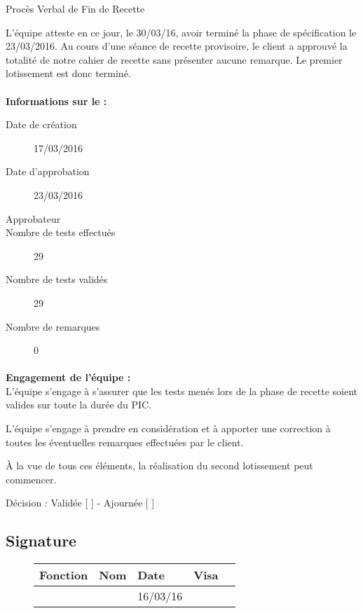 \documentclass[asi, sansVersion]{picInsa}
\begin{document}
 
 \begin{center}
  \LARGE{}
    Procès Verbal de Fin de Recette\\
 \end{center}
 
 \normalsize{}
 
L'équipe \nomEquipe{} atteste en ce jour, le 30/03/16, avoir terminé la phase de spécification le 23/03/2016.
Au cours d'une séance de recette provisoire, le client a approuvé la totalité de notre cahier de recette sans présenter aucune remarque. Le premier lotissement est donc terminé.


\paragraph{}
\textbf{Informations sur le \CDR :}

\begin{description}
  \item[Date de création]17/03/2016
  \item[Date d'approbation]23/03/2016
  \item[Approbateur]\nomClient
  \item[Nombre de tests effectués]29
  \item[Nombre de tests validés]29
  \item[Nombre de remarques]0
\end{description}


\paragraph{}
\textbf{Engagement de l'équipe :}\\


L'équipe \nomEquipe{} s'engage à s'assurer que les tests menés lors de la phase de recette soient valides sur toute la durée du PIC.


L'équipe \nomEquipe{} s'engage à prendre en considération et à apporter une correction à toutes les éventuelles remarques effectuées par le client.

À la vue de tous ces éléments, la réalisation du second lotissement peut commencer.

\begin{center}
Décision : Validée [ \checkmark{} ] - Ajournée [ ]
\end{center}

\subsection*{Signature}
\begin{figure}[H]
		\centering
		\begin{tabularx}{17cm}{|p{4cm}|X|X|X|X|}
		\hline
		\rowcolor[gray]{0.85} Fonction & Nom & Date & Visa \\
		\hline
		\CP{} & \Sergi{} & 16/03/16 & \\
		\hline
		\end{tabularx}
\end{figure}
\end{document}
